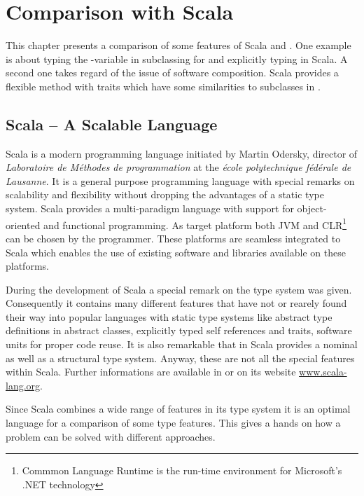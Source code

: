 \chapter{Comparison with Scala}
\label{sec:comparisonScala}
This chapter presents a comparison of some features of Scala and \ooplss.
One example is about typing the \self-variable in subclassing for
\ooplss and explicitly typing in Scala. A second one takes regard of the
issue of software composition. Scala provides a flexible method with
traits which have some similarities to subclasses in \ooplss.

\section{Scala -- A Scalable Language}
Scala is a modern programming language initiated by Martin Odersky,
director of \emph{Laboratoire de Méthodes de programmation} at the
\emph{école polytechnique fédérale de Lausanne}. It is a general
purpose programming language with special remarks on scalability
and flexibility without dropping the advantages of a static type
system. Scala provides a multi-paradigm language with support for
object-oriented and functional programming. As target platform both JVM
and CLR\footnote{Commmon Language Runtime is the run-time environment
for Microsoft's .NET technology} can be chosen by the programmer. These
platforms are seamless integrated to Scala which enables the use of
existing software and libraries available on these platforms.

During the development of Scala a special remark on the type system was
given. Consequently it contains many different features that have not or
rearely found their way into popular languages with static type systems
like abstract type definitions in abstract classes, explicitly typed self
references and traits, software units for proper code reuse. It is also
remarkable that in Scala provides a nominal as well as a structural
type system. Anyway, these are not all the special features within
Scala. Further informations are available in
\cite{odersky_scala_2010,odersky_programming_2008} or on its website
\href{http://www.scala-lang.org/}{www.scala-lang.org}.

Since Scala combines a wide range of features in its type system it is
an optimal language for a comparison of some type features. This gives
a hands on how a problem can be solved with different approaches.

